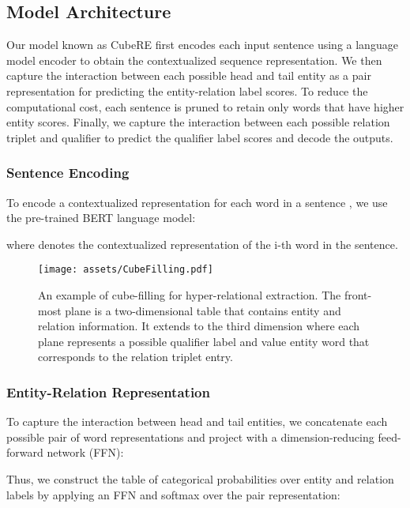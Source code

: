 \documentclass[11pt]{article}
\newcommand{\modelname}{CubeRE}
\begin{document}
\subsection{Model Architecture}

Our model known as \modelname{} first encodes each input sentence using a language model encoder to obtain the contextualized sequence representation.
We then capture the interaction between each possible head and tail entity as a pair representation for predicting the entity-relation label scores.
To reduce the computational cost, each sentence is pruned to retain only words that have higher entity scores.
Finally, we capture the interaction between each possible relation triplet and qualifier 
to predict the qualifier label scores and decode the outputs.

\subsubsection{Sentence Encoding}

To encode a contextualized representation for each word in a sentence , we use the pre-trained BERT \citep{devlin-etal-2019-bert} language model:

where  denotes the contextualized representation of the i-th word in the sentence.


\begin{figure}[!t]
\centering
\texttt{[image: assets/CubeFilling.pdf]}
\vspace{-3mm}
\caption{
An example of cube-filling for hyper-relational extraction.
The front-most plane is a two-dimensional table that contains entity and relation information.
It extends to the third dimension where each plane represents a possible qualifier label and value entity word that corresponds to the relation triplet entry.
\vspace{-5mm}}
\label{fig:cube}
\end{figure}

\subsubsection{Entity-Relation Representation}
To capture the interaction between head and tail entities, we concatenate each possible pair of word representations and project with a dimension-reducing feed-forward network (FFN): 

Thus, we construct the table of categorical probabilities over entity and relation labels by applying an FFN and softmax over the pair representation:
\end{document}
